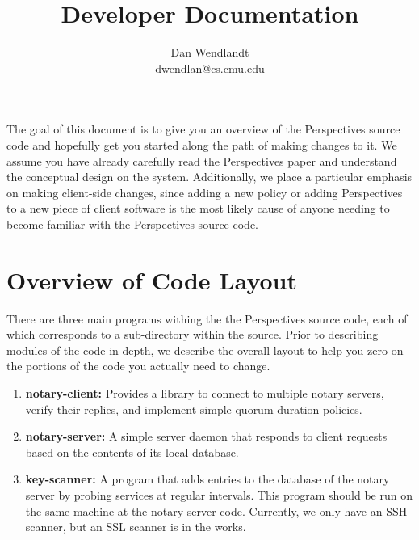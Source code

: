 \documentclass[pdftex,singlecolumn,11pt,letterpaper]{article}
\title{ \name Developer Documentation }
\author{Dan Wendlandt \\ dwendlan@cs.cmu.edu }
\newcommand{\name}{Perspectives\xspace}
\begin{document}
\maketitle 


The goal of this document is to give you an overview of the \name 
source code and hopefully get you started along the path of making changes to
it.  We assume you have already carefully read the \name paper and 
understand the conceptual design on the system.  Additionally, we place a 
particular emphasis on making client-side changes, since adding a new 
policy or adding \name to a new piece of client software is the most
likely cause of anyone needing to become familiar with the \name 
source code.  

\section{Overview of Code Layout}

There are three main programs withing the the \name source code, each of 
which corresponds to a sub-directory within the source.  Prior to 
describing modules of the code in depth, we describe the overall layout 
to help you zero on the portions of the code you actually need to change. 

\begin{enumerate}
\item \textbf{notary-client:} Provides a library to connect to multiple 
notary servers, verify their replies, and implement simple quorum duration
policies.   
\item \textbf{notary-server:} A simple server daemon that responds to client 
requests based on the contents of its local database.  
\item \textbf{key-scanner:}  A program that adds entries to the database 
of the notary server by probing services at regular intervals.  This 
program should be run on the same machine at the notary server code.  
Currently, we only have an SSH scanner, but an SSL scanner is in the works.   
\end{enumerate} 
\end{document}
